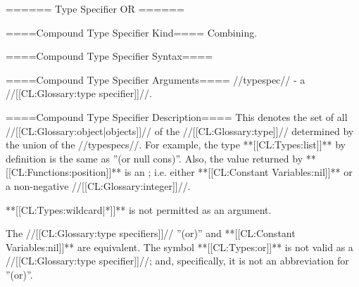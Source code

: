 ====== Type Specifier OR ======

====Compound Type Specifier Kind====
Combining.

====Compound Type Specifier Syntax====

====Compound Type Specifier Arguments====
//typespec// - a //[[CL:Glossary:type specifier]]//.

====Compound Type Specifier Description====
This denotes the set of all //[[CL:Glossary:object|objects]]// of the //[[CL:Glossary:type]]// determined by the union of the //typespecs//. For example, the type **[[CL:Types:list]]** by definition is the same as ''(or null cons)''. Also, the value returned by **[[CL:Functions:position]]** is an ; i.e. either **[[CL:Constant Variables:nil]]** or a non-negative //[[CL:Glossary:integer]]//.

**[[CL:Types:wildcard|*]]** is not permitted as an argument.

The //[[CL:Glossary:type specifiers]]// ''(or)'' and **[[CL:Constant Variables:nil]]** are equivalent. The symbol **[[CL:Types:or]]** is not valid as a //[[CL:Glossary:type specifier]]//; and, specifically, it is not an abbreviation for ''(or)''.

